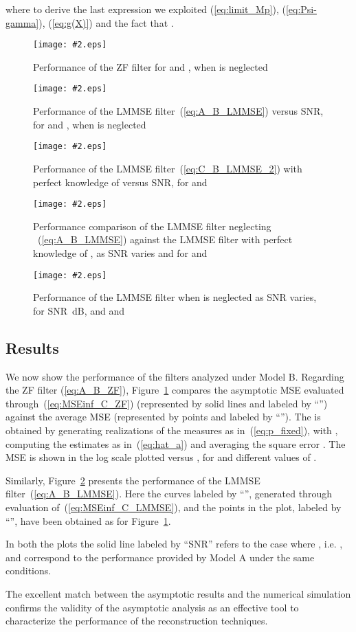 \documentclass[final, a4paper]{IEEEtran}
\newcommand{\insertfig}[4]{
\begin{figure}[tbh]
\centerline{\texttt{[image: \#2.eps]}}
\vspace{-0.3cm}
\caption{#3}\label{#4}\end{figure}}
\begin{document}
where to derive the last expression we exploited (\ref{eq:limit_Mp}), (\ref{eq:Psi-gamma}),
(\ref{eq:g(X)}) and the fact that .


\insertfig{1.00}{MSE_model_B_0}{Performance of the ZF filter for  and , 
when  is neglected}{fig:MSE_model_B_0}
\insertfig{1.00}{MSE_model_B_1}{Performance of the LMMSE filter~(\ref{eq:A_B_LMMSE}) versus SNR, 
for  and , when  is neglected}{fig:MSE_model_B_1}
\insertfig{1.00}{MSE_model_B_2}{Performance of the LMMSE filter~(\ref{eq:C_B_LMMSE_2}) with perfect
knowledge of  versus SNR, for  and }{fig:MSE_model_B_2}
\insertfig{1.00}{MSE_model_B_3}{Performance comparison of the LMMSE filter neglecting
~(\ref{eq:A_B_LMMSE})
against the LMMSE filter with perfect knowledge of , as SNR varies and
for  and }{fig:MSE_model_B_3}
\insertfig{1.00}{MSE_model_B_4}{Performance of the LMMSE filter when 
is neglected as SNR varies, for SNR~dB, and  and }{fig:MSE_model_B_4}

\subsection{Results \label{subsec:C_numerical_results}}

We now show the performance of the filters analyzed under Model B.
Regarding the ZF filter (\ref{eq:A_B_ZF}),
Figure~\ref{fig:MSE_model_B_0} compares the asymptotic MSE evaluated
through~(\ref{eq:MSEinf_C_ZF}) (represented by solid lines and
labeled by ``'') against the average MSE (represented by
points and labeled by ``''). The  is obtained by
generating  realizations of the measures as
in~(\ref{eq:p_fixed}), with , computing the estimates as
in~(\ref{eq:hat_a}) and averaging the square error
. The MSE is shown in the log scale plotted
versus , for  and different values of .

Similarly, Figure~\ref{fig:MSE_model_B_1} presents the performance of the
LMMSE filter~(\ref{eq:A_B_LMMSE}). Here the curves labeled by ``'', generated through evaluation of~(\ref{eq:MSEinf_C_LMMSE}),
and the points in the plot, labeled by ``'', have been obtained as for Figure~\ref{fig:MSE_model_B_0}.

In both the plots the solid line labeled by ``SNR'' refers to the case
where , i.e. , and correspond to the performance provided by Model A under the same conditions.

 The excellent match between the asymptotic results and the
numerical simulation confirms the validity of the asymptotic analysis as an effective tool
to characterize the performance of the reconstruction techniques.
\end{document}
